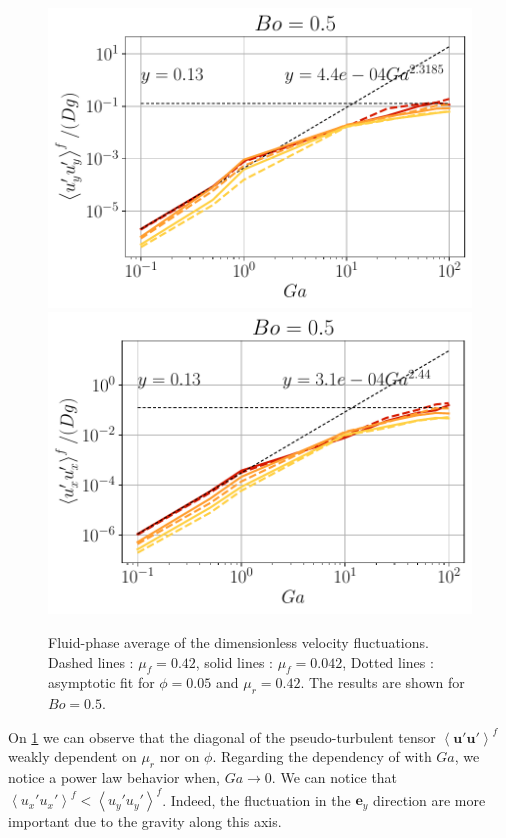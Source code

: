\begin{figure}[h!]
    \centering
    \includegraphics[height=0.22\textheight]{image/N_10/UU/UU_fyy_Bo_0_5.pdf}
    \includegraphics[height=0.22\textheight]{image/N_10/UU/UU_fxx_Bo_0_5.pdf}
    \caption{Fluid-phase average of the dimensionless velocity fluctuations. Dashed lines : $\mu_f = 0.42$, solid lines : $\mu_f = 0.042$, Dotted lines : asymptotic fit for $\phi = 0.05$ and $\mu_r = 0.42$. The results are shown for $Bo = 0.5$.} 
    \label{fig:UUf}
\end{figure} 
On \ref{fig:UUf} we can observe that the diagonal of the pseudo-turbulent tensor $\left<\bm{u'u'}\right>^f$ weakly dependent on $\mu_r$ nor on $\phi$.
Regarding the dependency of  with $Ga$, we notice a power law behavior when, $Ga \rightarrow 0$. 
We can notice that $\left<{u_x'u_x'}\right>^f  < \left<{u_y'u_y'}\right>^f$.
Indeed, the fluctuation in the $\bm{e}_y$ direction are more important due to the gravity along this axis.  

